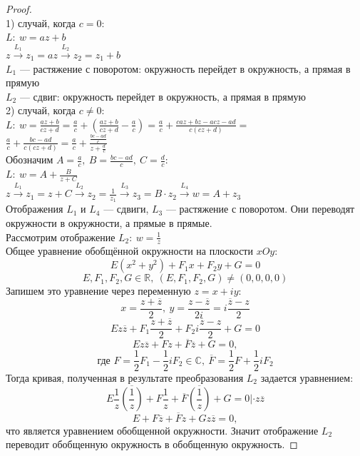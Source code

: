 \begin{proof}
    \ \\
    1) случай, когда $c=0$:\\
    $L: \ w = az+b$\\
    $z \overset{L_1}{\rightarrow} z_1=az \overset{L_2}{\rightarrow}z_2=z_1+b$\\
    $L_1$ --- растяжение с поворотом: окружность перейдет в окружность, а прямая в прямую\\
    $L_2$ --- сдвиг: окружность перейдет в окружность, а прямая в прямую\\[2mm]
    2) случай, когда $c\neq 0$:\\
    $L: \ w=\frac{az+b}{cz+d}=\frac{a}{c} +\left(\frac{az+b}{cz+d}-\frac{a}{c}\right) = \frac{a}{c}+\frac{caz+bz-acz-ad}{c(cz+d)}=$\\[2mm]
    $\frac{a}{c}+\frac{bc-ad}{c(cz+d)}=\frac{a}{c}+\frac{\frac{bc-ad}{c}}{z+\frac{d}{c}}$\\[2mm]
    Обозначим $A=\frac{a}{c}, \ B=\frac{bc-ad}{c}, \ C=\frac{d}{c}:$\\[2mm]
    $L: \ w = A + \frac{B}{z+C}$\\[2mm]
    $z \overset{L_1}{\rightarrow} z_1=z+C \overset{L_2}{\rightarrow}z_2=\frac{1}{z_1} \overset{L_3}{\rightarrow}z_3=B\cdot z_2 \overset{L_4}{\rightarrow} w = A+z_3$\\[2mm]
    Отображения $L_1$ и $L_4$ --- сдвиги, $L_3$ --- растяжение с поворотом. Они переводят окружности в окружности, а прямые в прямые.\\
    Рассмотрим отображение $L_2: \ w=\frac{1}{z}$\\[2mm] 
    Общее уравнение обобщённой окружности на плоскости $xOy$:
    $$E(x^2+y^2) +F_1x + F_2 y + G=0$$
    $$E, F_1, F_2, G \in \mathbb{R}, \ (E, F_1, F_2, G) \neq (0, 0, 0, 0)$$
    Запишем это уравнение через переменную $z=x+iy$:
    $$x=\frac{z+\overline{z}}{2}, \ y=\frac{z-\overline{z}}{2i}=i\frac{\overline{z}-z}{2}$$
    $$Ez\overline{z}+F_1\frac{z+\overline{z}}{2}+F_2i\frac{\overline{z}-z}{2}+G=0$$
    $$Ez\overline{z}+Fz+\overline{F}\overline{z}+G=0,$$
    $$\text{где }F=\frac{1}{2}F_1-\frac{1}{2}iF_2 \in \mathbb{C}, \ \overline{F} = \frac{1}{2}F+\frac{1}{2}iF_2$$
    Тогда кривая, полученная в результате преобразования $L_2$ задается уравнением:
    $$E\frac{1}{z}\overline{\left(\frac{1}{z}\right)}+F\frac{1}{z}+\overline{F}\overline{\left(\frac{1}{z}\right)}+G=0|\cdot z\overline{z}$$
    $$E+F\overline{z}+\overline{F}z+Gz\overline{z}=0,$$
    что является уравнением обобщенной окружности.
    Значит отображение $L_2$ переводит обобщенную окружность в обобщенную окружность.
\end{proof}


